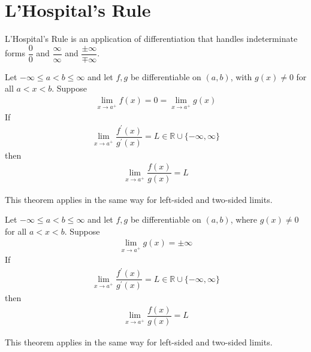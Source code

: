 \section{L'Hospital's Rule}

L'Hospital's Rule is an application of differentiation that handles indeterminate forms $\dfrac{0}{0}$ and $\dfrac{\infty}{\infty}$ and $\dfrac{\pm \infty}{\mp \infty}$.

\vspace{0.1in}
\begin{theorem}
Let $-\infty \leq a < b \leq \infty$ and let $f, g$ be differentiable on $(a, b)$, with $g(x) \neq 0$ for all $a < x < b$. Suppose 
\begin{align*}
    \lim_{x \longrightarrow a^{+}} f(x) = 0 = \lim_{x \longrightarrow a^{+}} g(x)
\end{align*}
If
\begin{align*}
    \lim_{x \longrightarrow a^{+}} \dfrac{f^{'}(x)}{g^{'}(x)} = L \in \mathbb{R} \cup \{-\infty, \infty\}
\end{align*}
then
\begin{align*}
    \lim_{x \longrightarrow a^{+}} \dfrac{f(x)}{g(x)} = L
\end{align*}
\label{L'Hospital_1}
\end{theorem}

\begin{note}
This theorem applies in the same way for left-sided and two-sided limits.
\end{note}

\begin{theorem}
Let $-\infty \leq a < b \leq \infty$ and let $f, g$ be differentiable on $(a, b)$, where $g(x) \neq 0$ for all $a < x < b$. Suppose
\begin{align*}
    \lim_{x \longrightarrow a^{+}} g(x) = \pm \infty 
\end{align*}
If
\begin{align*}
    \lim_{x \longrightarrow a^{+}} \dfrac{f^{'}(x)}{g^{'}(x)} = L \in \mathbb{R} \cup \{-\infty, \infty\}
\end{align*}
then
\begin{align*}
    \lim_{x \longrightarrow a^{+}} \dfrac{f(x)}{g(x)} = L
\end{align*}
\label{L'Hospital_2}
\end{theorem}

\begin{note}
This theorem applies in the same way for left-sided and two-sided limits.
\end{note}

